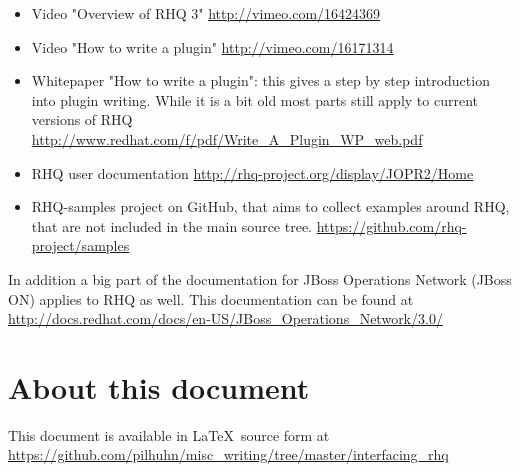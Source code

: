\documentclass[twocolumn,10pt,a4paper]{article}
\begin{document}
\begin{itemize}
\item Video "Overview of RHQ 3" \url{http://vimeo.com/16424369}
\item Video "How to write a plugin" \url{http://vimeo.com/16171314}
\item Whitepaper "How to write a plugin": this gives a step by step introduction into plugin writing. While it is a bit old most parts still apply to current versions of RHQ \url{http://www.redhat.com/f/pdf/Write_A_Plugin_WP_web.pdf}
\item RHQ user documentation \url{http://rhq-project.org/display/JOPR2/Home}
\item RHQ-samples project on GitHub, that aims to collect examples around RHQ, that are not included in the main source tree. \url{https://github.com/rhq-project/samples}
\end{itemize}

In addition a big part of the documentation for JBoss Operations Network (JBoss ON) applies to RHQ as well. This documentation can be found at \url{http://docs.redhat.com/docs/en-US/JBoss_Operations_Network/3.0/}

\section*{About this document}
This document is available in \LaTeX\ source form at \url{https://github.com/pilhuhn/misc_writing/tree/master/interfacing_rhq}
\end{document}
